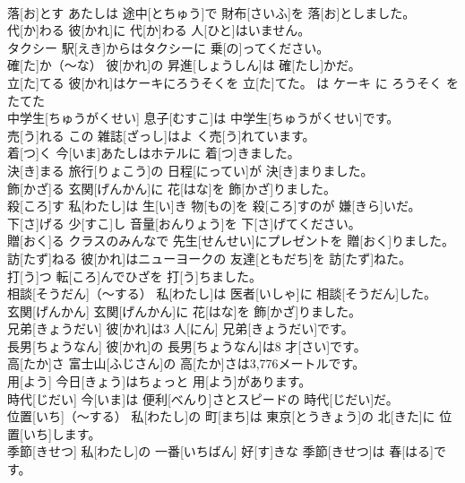 \documentclass[8pt]{extreport}
\begin{document}
\begin{CJK}{UTF8}{min}
\\	落[お]とす	あたしは 途中[とちゅう]で 財布[さいふ]を 落[お]としました。		
\\	代[か]わる	彼[かれ]に 代[か]わる 人[ひと]はいません。		
\\	タクシー	駅[えき]からはタクシーに 乗[の]ってください。		
\\	確[た]か（～な）	彼[かれ]の 昇進[しょうしん]は 確[たし]かだ。		
\\	立[た]てる	彼[かれ]はケーキにろうそくを 立[た]てた。 は ケーキ に ろうそく を たてた		
\\	中学生[ちゅうがくせい]	息子[むすこ]は 中学生[ちゅうがくせい]です。		
\\	売[う]れる	この 雑誌[ざっし]はよ く売[う]れています。		
\\	着[つ]く	今[いま]あたしはホテルに 着[つ]きました。		
\\	決[き]まる	旅行[りょこう]の 日程[にってい]が 決[き]まりました。		
\\	飾[かざ]る	玄関[げんかん]に 花[はな]を 飾[かざ]りました。		
\\	殺[ころ]す	私[わたし]は 生[い]き 物[もの]を 殺[ころ]すのが 嫌[きら]いだ。		
\\	下[さ]げる	少[すこ]し 音量[おんりょう]を 下[さ]げてください。		
\\	贈[おく]る	クラスのみんなで 先生[せんせい]にプレゼントを 贈[おく]りました。		
\\	訪[たず]ねる	彼[かれ]はニューヨークの 友達[ともだち]を 訪[たず]ねた。		
\\	打[う]つ	転[ころ]んでひざを 打[う]ちました。		
\\	相談[そうだん]（～する）	私[わたし]は 医者[いしゃ]に 相談[そうだん]した。		
\\	玄関[げんかん]	玄関[げんかん]に 花[はな]を 飾[かざ]りました。		
\\	兄弟[きょうだい]	彼[かれ]は3 人[にん] 兄弟[きょうだい]です。		
\\	長男[ちょうなん]	彼[かれ]の 長男[ちょうなん]は8 才[さい]です。		
\\	高[たか]さ	富士山[ふじさん]の 高[たか]さは3,776メートルです。		
\\	用[よう]	今日[きょう]はちょっと 用[よう]があります。		
\\	時代[じだい]	今[いま]は 便利[べんり]さとスピードの 時代[じだい]だ。		
\\	位置[いち]（～する）	私[わたし]の 町[まち]は 東京[とうきょう]の 北[きた]に 位置[いち]します。		
\\	季節[きせつ]	私[わたし]の 一番[いちばん] 好[す]きな 季節[きせつ]は 春[はる]です。		

\end{CJK}
\end{document}
